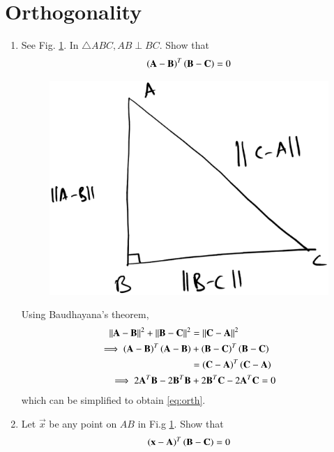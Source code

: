 \documentclass[journal,12pt,twocolumn]{IEEEtran}
\renewcommand\thesection{\arabic{section}}
\begin{document}
\section{Orthogonality}
\begin{enumerate}[label=\thesection.\arabic*
,ref=\thesection.\theenumi]
\item See Fig. \ref{fig:orth}.  In $\triangle ABC, AB \perp BC$. Show that
\begin{equation}
\left(\mathbf{A}-\mathbf{B}\right)^T\left(\mathbf{B}-\mathbf{C}\right) = 0
\label{eq:orth}
\end{equation}
\begin{figure}
\centering
\includegraphics[width=\columnwidth]{./figs/orth.eps}
\caption{}
\label{fig:orth}
\end{figure}
%
\solution Using Baudhayana's theorem,
\begin{align}
\lVert\mathbf{A}-\mathbf{B}\rVert^2 + \lVert\mathbf{B}-\mathbf{C}\rVert^2 &= 
\lVert\mathbf{C}-\mathbf{A}\rVert^2
\\
\implies 
\left(\mathbf{A}-\mathbf{B}\right)^T\left(\mathbf{A}-\mathbf{B}\right) 
&+ 
\left(\mathbf{B}-\mathbf{C}\right)^T\left(\mathbf{B}-\mathbf{C}\right) 
\nonumber \\
&= 
\left(\mathbf{C}-\mathbf{A}\right)^T \left(\mathbf{C}-\mathbf{A}\right)
\nonumber \\
\implies 
2\mathbf{A}^T\mathbf{B} - 2\mathbf{B}^T\mathbf{B}&+2\mathbf{B}^T\mathbf{C}-2\mathbf{A}^T\mathbf{C}
=0
\end{align}
which can be simplified to obtain \eqref{eq:orth}.
%
\item Let $\vec{x}$ be any point on $AB$ in Fi.g \ref{fig:orth}.  Show that
\begin{equation}
\brak{\vec{x}-\vec{A}}^T\brak{\vec{B}-\vec{C}} = 0

\end{equation}
\end{enumerate}
\end{document}
